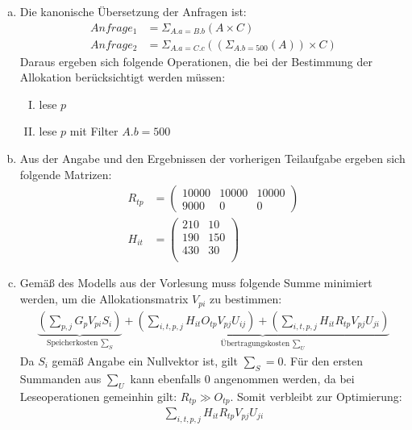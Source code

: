\documentclass[11pt,a4paper]{scrartcl}
\begin{document}
\begin{enumerate}[a)]
\item Die kanonische Übersetzung der Anfragen ist:
  \begin{align*}
    Anfrage_1 &= \Sigma_{A.a = B.b}(A \times C) \\
    Anfrage_2 &= \Sigma_{A.a = C.c}\left(\left(\Sigma_{A.b=500}(A)\right)
      \times C\right)
  \end{align*}
  Daraus ergeben sich folgende Operationen, die bei der Bestimmung der
  Allokation berücksichtigt werden müssen:
  \begin{enumerate}[I)]
  \item lese $p$
  \item lese $p$ mit Filter $A.b = 500$
  \end{enumerate}
\item Aus der Angabe und den Ergebnissen der vorherigen Teilaufgabe ergeben
  sich folgende Matrizen:
  \begin{align*}
    R_{tp} &=
    \begin{pmatrix}
      10000 & 10000 & 10000 \\
      9000 & 0 & 0
    \end{pmatrix} \\
    H_{it} &=
    \begin{pmatrix}
      210 & 10 \\
      190 & 150 \\
      430 & 30 \\
    \end{pmatrix}
  \end{align*}
\item Gemäß des Modells aus der Vorlesung muss folgende Summe minimiert werden,
  um die Allokationsmatrix $V_{pi}$ zu bestimmen:
  \begin{align*}
    \underbrace{\left(\sum_{p,j} G_p V_{pi} S_i\right)}_{\text{Speicherkosten }
   \sum_S} +
    \underbrace{\left(\sum_{i,t,p,j} H_{it} O_{tp} V_{pj} U_{ij} \right) +
    \left(\sum_{i,t,p,j}H_{it} R_{tp} V_{pj}
      U_{ji}\right)}_{\text{Übertragungskosten } \sum_U}
  \end{align*}
  Da $S_i$ gemäß Angabe ein Nullvektor ist, gilt $\sum_S = 0$.  Für den ersten
  Summanden aus $\sum_U$ kann ebenfalls $0$ angenommen werden, da bei
  Leseoperationen gemeinhin gilt: $R_{tp} \gg O_{tp}$.  Somit verbleibt zur Optimierung:
  \begin{align}
    \label{eq:min}
    \sum_{i,t,p,j}H_{it} R_{tp} V_{pj} U_{ji}
  \end{align}

\end{enumerate}
\end{document}
